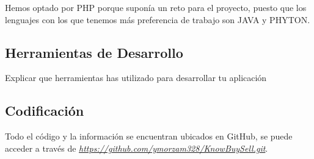 \documentclass{article}
\begin{document}
Hemos optado por PHP porque suponía un reto para el proyecto, puesto que los lenguajes con los que tenemos más preferencia de trabajo son JAVA y PHYTON.

\subsection{Herramientas de Desarrollo}
Explicar que herramientas has utilizado para desarrollar tu aplicación
\subsection{Codificación}
Todo el código y la información se encuentran ubicados en GitHub, se puede acceder a través de \textit{\url{https://github.com/ymorzam328/KnowBuySell.git}}.\\

\end{document}

